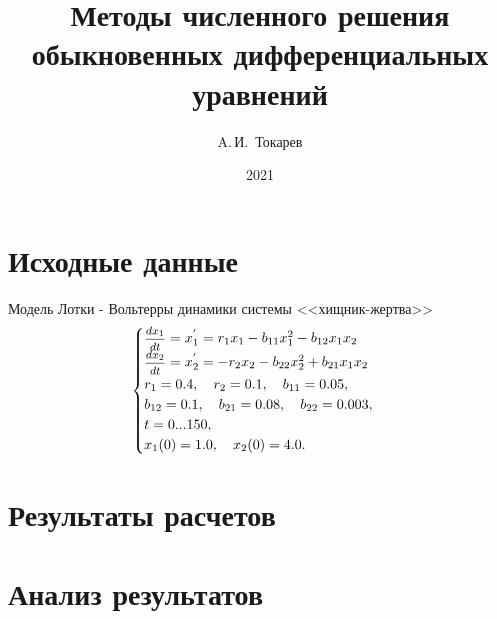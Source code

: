 \documentclass[12pt, a4paper]{article}
\title{Методы численного решения обыкновенных дифференциальных уравнений}
\author{A.\,И.~Токарев}
\date{2021}
\begin{document}
\maketitle
\tableofcontents 
\newpage

\section{Исходные данные}
Модель Лотки - Вольтерры динамики системы <<хищник-жертва>>
\begin{equation*}
\begin{cases}
\hbox{\footnotesize$\displaystyle\frac{dx_1}{dt}$}= x_1^{'} =r_1x_1 - b_{11}x_1^2-b_{12}x_1x_2\\
\hbox{\footnotesize$\displaystyle\frac{dx_2}{dt}$}= x_2^{'} =-r_2x_2-b_{22}x_2^2+b_{21}x_1x_2\\
r_1 = 0{.}4, \quad r_2 = 0{.}1, \quad b_{11} = 0{.}05,\\
b_{12} = 0{.}1,\quad b_{21} = 0{.}08,\quad b_{22} = 0{.}003,\\
t = 0...150,\\
x_1(0) = 1{.}0,\quad x_2(0) = 4{.}0.
\end{cases}
\end{equation*}

\section{Результаты расчетов}
\newpage

\section{Анализ результатов}
\newpage
\end{document}
